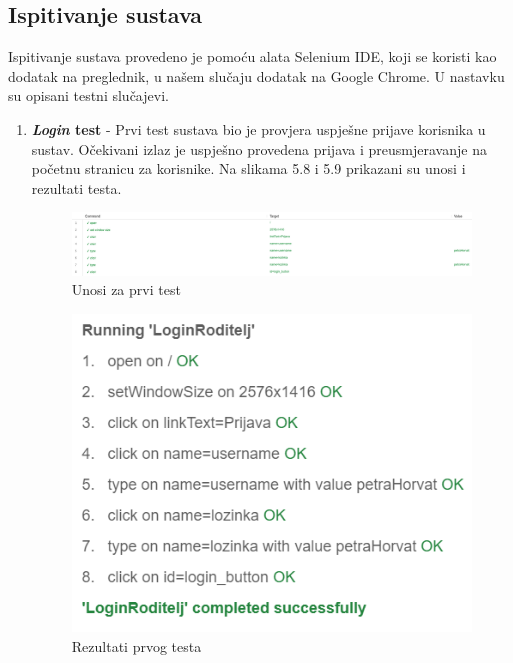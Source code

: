 			
			\subsection{Ispitivanje sustava}
			
			 Ispitivanje sustava provedeno je pomoću alata Selenium IDE, koji se koristi kao dodatak na preglednik, u našem slučaju dodatak na Google Chrome. U nastavku su opisani testni slučajevi.
			 \begin{enumerate}
			 	\item \textbf{\textit{Login} test} - Prvi test sustava bio je provjera uspješne prijave korisnika u sustav. Očekivani izlaz je uspješno provedena prijava i preusmjeravanje na početnu stranicu za korisnike. Na slikama 5.8 i 5.9 prikazani su unosi i rezultati testa.
			 	\begin{figure}[H]
			 		\includegraphics[scale=0.3]{slike/testSustava1.PNG} %
			 		\centering
			 		\caption{Unosi za prvi test}
			 		\label{fig:testsustava1}
			 	\end{figure}
			 	\begin{figure}[H]
			 		\includegraphics[scale=0.6]{slike/testSustava2.PNG} %
			 		\centering
			 		\caption{Rezultati prvog testa}
			 		\label{fig:testsustava2}

\end{figure}
\end{enumerate}
